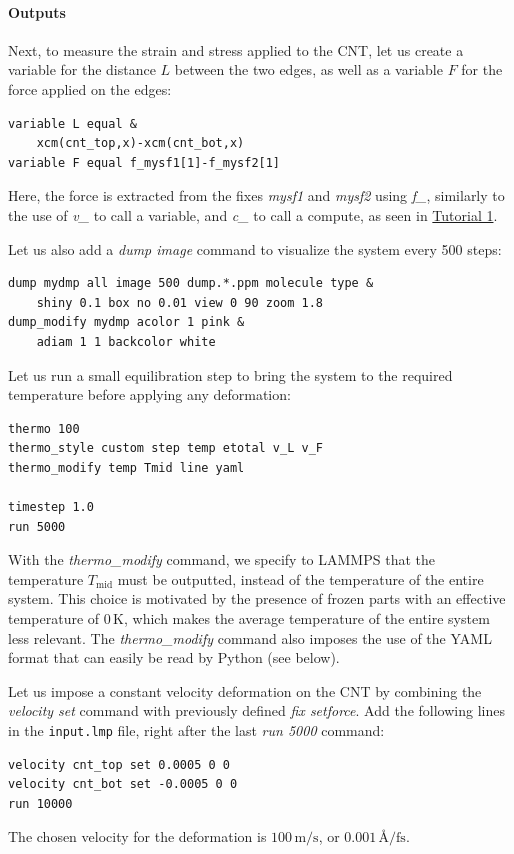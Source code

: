 \documentclass[9pt,tutorial]{livecoms}
\newcommand{\flecmd}[1]{\textcolor{command}{\texttt{#1}}} %
\begin{document}
\paragraph{Outputs}
Next, to measure the strain and stress applied to the CNT, let us create a
variable for the distance $L$ between the two edges, as well as  a variable $F$
for the force applied on the edges:
\begin{lstlisting}
variable L equal &
    xcm(cnt_top,x)-xcm(cnt_bot,x)
variable F equal f_mysf1[1]-f_mysf2[1]
\end{lstlisting}
Here, the force is extracted from the fixes \textit{mysf1} and \textit{mysf2}
using \textit{f\_}, similarly to the use of \textit{v\_} to call a variable,
and \textit{c\_} to call a compute, as seen in \hyperref[lennard-jones-label]{Tutorial 1}.

Let us also add a \textit{dump image} command to visualize the system
every 500 steps:
\begin{lstlisting}
dump mydmp all image 500 dump.*.ppm molecule type &
    shiny 0.1 box no 0.01 view 0 90 zoom 1.8
dump_modify mydmp acolor 1 pink &
    adiam 1 1 backcolor white
\end{lstlisting}
Let us run a small equilibration step to bring the system to the required
temperature before applying any deformation:
\begin{lstlisting}
thermo 100
thermo_style custom step temp etotal v_L v_F
thermo_modify temp Tmid line yaml

timestep 1.0
run 5000
\end{lstlisting}
With the \textit{thermo\_modify} command, we specify to LAMMPS that the
temperature $T_\mathrm{mid}$ must be outputted, instead of the
temperature of the entire system. This choice is motivated by the presence of
frozen parts with an effective temperature of 0\,K, which makes the average
temperature of the entire system less relevant. The \textit{thermo\_modify}
command also imposes the use of the YAML format that can easily be read by
Python (see below).

Let us impose a constant velocity deformation on the CNT
by combining the \textit{velocity set} command with previously defined
\textit{fix setforce}. Add the following lines in the \flecmd{input.lmp} file,
right after the last \textit{run 5000} command:
\begin{lstlisting}
velocity cnt_top set 0.0005 0 0
velocity cnt_bot set -0.0005 0 0
run 10000
\end{lstlisting}
The chosen velocity for the deformation is $100\,\text{m/s}$, or
$0.001\,\text{\AA{}/fs}$.
\end{document}

